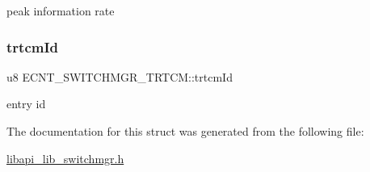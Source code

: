 peak information rate \mbox{\label{structECNT__SWITCHMGR__TRTCM_a28d1d413f5c797b20c6b2875600a97a6}} 
\subsubsection{\texorpdfstring{trtcm\+Id}{trtcmId}}
{\footnotesize\ttfamily u8 E\+C\+N\+T\+\_\+\+S\+W\+I\+T\+C\+H\+M\+G\+R\+\_\+\+T\+R\+T\+C\+M\+::trtcm\+Id}

entry id 

The documentation for this struct was generated from the following file\+:\begin{DoxyCompactItemize}
\item 
\hyperlink{libapi__lib__switchmgr_8h}{libapi\+\_\+lib\+\_\+switchmgr.\+h}\end{DoxyCompactItemize}
